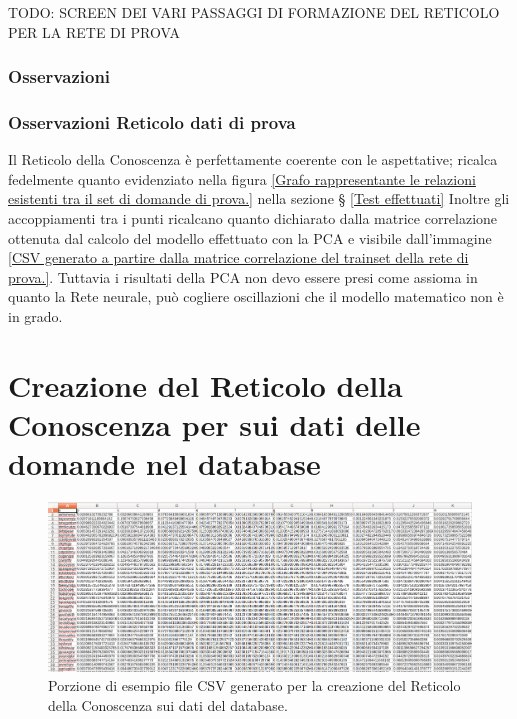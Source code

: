 TODO: SCREEN DEI VARI PASSAGGI DI FORMAZIONE DEL RETICOLO PER LA RETE DI PROVA


\subsubsection{Osservazioni}
\subsubsection{Osservazioni Reticolo dati di prova}
Il Reticolo della Conoscenza \`e perfettamente coerente con le aspettative; ricalca fedelmente quanto evidenziato nella figura \ref{Grafo rappresentante le relazioni esistenti tra il set di domande di prova.} nella sezione § \ref{Test effettuati} Inoltre gli accoppiamenti tra i punti ricalcano quanto dichiarato dalla matrice correlazione ottenuta dal calcolo del modello effettuato con la PCA e visibile dall'immagine \ref{CSV generato a partire dalla matrice correlazione del trainset della rete di prova.}. Tuttavia i risultati della PCA non devo essere presi come assioma in quanto la Rete neurale, pu\`o cogliere oscillazioni che il modello matematico non \`e in grado.

\section{Creazione del Reticolo della Conoscenza per sui dati delle domande nel database}
\label{Creazione del Reticolo della Conoscenza per sui dati delle domande nel database}

\noindent
\begin{figure}[H]
\centering
	\includegraphics[width=1\linewidth]{./image/fileCSV_rete-db-10neuroni.png}
	\caption{Porzione di esempio file CSV generato per la creazione del Reticolo della Conoscenza sui dati del database.}
	\label{Porzione di esempio file CSV generato per la creazione del Reticolo della Conoscenza sui dati del database.}
\end{figure}
\noindent


